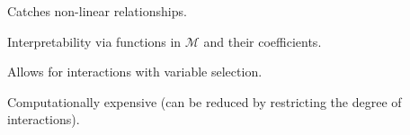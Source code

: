 {    \begin{my_pros_cons_table}{
        \item Catches non-linear relationships.
        \item Interpretability via functions in $\mathcal{M}$ and their coefficients.
        \item Allows for interactions with variable selection.
    }{
        \item Computationally expensive (can be reduced by restricting the degree of interactions).
    }
    \end{my_pros_cons_table}
}

